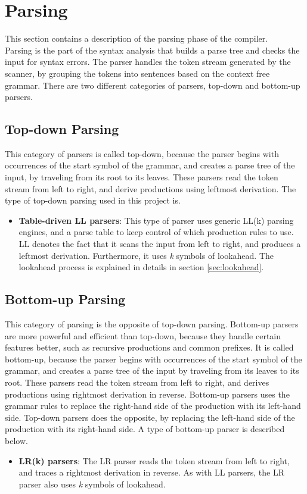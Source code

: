 \section{Parsing}
This section contains a description of the parsing phase of the compiler. 
\\Parsing is the part of the syntax analysis that builds a parse tree and checks the input for syntax errors. The parser handles the token stream generated by the scanner, by grouping the tokens into sentences based on the context free grammar. There are two different categories of parsers, top-down and bottom-up parsers.

\subsection{Top-down Parsing}
This category of parsers is called top-down, because the parser begins with occurrences of the start symbol of the grammar, and creates a parse tree of the input, by traveling from its root to its leaves. These parsers read the token stream from left to right, and derive productions using leftmost derivation. The type of top-down parsing used in this project is.

\begin{itemize}
\item \textbf{Table-driven LL parsers}: This type of parser uses generic LL(k) parsing engines, and a parse table to keep control of which production rules to use. LL denotes the fact that it scans the input from left to right, and produces a leftmost derivation. Furthermore, it uses \textit{k} symbols of lookahead. The lookahead process is explained in details in section \ref{sec:lookahead}.
\end{itemize}

\subsection{Bottom-up Parsing}
This category of parsing is the opposite of top-down parsing. Bottom-up parsers are more powerful and efficient than top-down, because they handle certain features better, such as recursive productions and common prefixes. It is called bottom-up, because the parser begins with occurrences of the start symbol of the grammar, and creates a parse tree of the input by traveling from its leaves to its root. These parsers read the token stream from left to right, and derives productions using rightmost derivation in reverse. Bottom-up parsers uses the grammar rules to replace the right-hand side of the production with its left-hand side. Top-down parsers does the opposite, by replacing the left-hand side of the production with its right-hand side. \cite{compiler:CAC} A type of bottom-up parser is described below. 

\begin{itemize}
\item \textbf{LR(k) parsers}: The LR parser reads the token stream from left to right, and traces a rightmost derivation in reverse. As with LL parsers, the LR parser also uses \textit{k} symbols of lookahead.  
\end{itemize}
